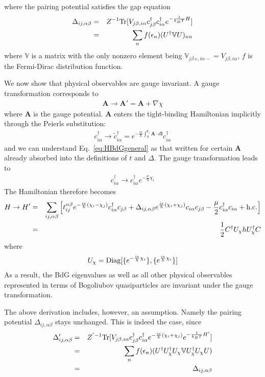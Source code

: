 where the pairing potential satisfies the gap equation
\begin{eqnarray}
	\Delta_{ij,\alpha\beta} &=& Z^{-1}{\rm Tr}[V_{j\beta,i\alpha}c_{j\beta}^\dag c^\dag_{i\alpha} e^{-\frac{1}{k_B T} H}] \\\nonumber
	&=& \sum_n f(\epsilon_n) (U^\dag {\mathbb{V}} U)_{nn}
\end{eqnarray}
where $\mathbb{V}$ is a matrix with the only nonzero element being $\mathbb{V}_{j\beta+,i\alpha-} = V_{j\beta, i\alpha}$, $f$ is the Fermi-Dirac distribution function.

We now show that physical observables are gauge invariant. A gauge transformation corresponds to
\begin{eqnarray}
	\mathbf A\rightarrow \mathbf A' = \mathbf A + \nabla \chi
\end{eqnarray}
where $\mathbf A$ is the gauge potential. $\mathbf A$ enters the tight-binding Hamiltonian implicitly through the Peierls substitution:
\begin{eqnarray}\label{eq:peierls}
	c_{i\alpha}^\dag \rightarrow \tilde{c}^\dag_{i\alpha} = e^{-\frac{ie}{\hbar} \int_0^{\mathbf r_i} \mathbf A\cdot d \mathbf l} c_{i\alpha}^\dag
\end{eqnarray}
and we can understand Eq.~\eqref{eq:HBdGgeneral} as that written for certain $\mathbf A$ already absorbed into the definitions of $t$ and $\Delta$. The gauge transformation leads to
\begin{eqnarray}
	c^\dag_{i\alpha} \rightarrow c^\dag_{i\alpha} e^{-\frac{ie}{\hbar}\chi_i}
\end{eqnarray}
The Hamiltonian therefore becomes
\begin{eqnarray}
	H\rightarrow H'&=& \sum_{ij,\alpha\beta}\left[ t_{ij}^{\alpha\beta} e^{-\frac{ie}{\hbar}(\chi_i - \chi_j)} c_{i\alpha}^\dag c_{j\beta} + \Delta_{ij,\alpha\beta} e^{\frac{ie}{\hbar}(\chi_i + \chi_j)}c_{i\alpha}c_{j\beta}  - \frac{\mu}{2}c_{i\alpha}^\dag c_{i\alpha} + {\rm h.c.} \right] \\\nonumber
	&=&\frac{1}{2}C^\dag U_\chi h U_\chi^\dag C
\end{eqnarray}
where
\begin{eqnarray}
	U_\chi = {\rm Diag}[\{e^{-\frac{ie}{\hbar}\chi_i}\},\{e^{\frac{ie}{\hbar}\chi_i}\}]
\end{eqnarray}
As a result, the BdG eigenvalues as well as all other physical observables represented in terms of Bogoliubov quasiparticles are invariant under the gauge transformation.

The above derivation includes, however, an assumption. Namely the pairing potential $\Delta_{ij,\alpha\beta}$ stays unchanged. This is indeed the case, since
\begin{eqnarray}
	\Delta'_{ij,\alpha\beta} &=& Z^{'-1}{\rm Tr}[V_{j\beta,i\alpha} c^\dag_{j\beta}c^{\dag}_{i\alpha} e^{-\frac{ie}{\hbar}(\chi_i + \chi_j)} e^{-\frac{1}{k_B T}H'}] \\\nonumber
	&=& \sum_{n}f(\epsilon_n) (U^\dag U^\dag_\chi U_\chi \mathbb{V} U_\chi^\dag U_\chi U) \\\nonumber
	&=&\Delta_{ij,\alpha\beta}
\end{eqnarray}

